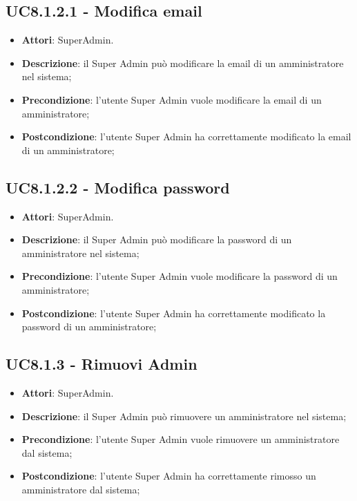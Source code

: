 \documentclass[../AnalisiDeiRequisiti.tex]{subfiles}
\begin{document}
\subsection{UC8.1.2.1 - Modifica email} 
\label{sssec:UC8.1.2.1} 
\begin{itemize} 
\item \textbf{Attori}: SuperAdmin.
\item \textbf{Descrizione}: il Super Admin può modificare la email di un amministratore nel sistema;
\item \textbf{Precondizione}: l'utente Super Admin vuole modificare la email di un amministratore;
\item \textbf{Postcondizione}: l'utente Super Admin ha correttamente  modificato la email di un amministratore;
\end{itemize} 
\subsection{UC8.1.2.2 - Modifica password} 
\label{sssec:UC8.1.2.2} 
\begin{itemize} 
\item \textbf{Attori}: SuperAdmin.
\item \textbf{Descrizione}: il Super Admin può modificare la password di un amministratore nel sistema;
\item \textbf{Precondizione}: l'utente Super Admin vuole modificare la password di un amministratore;
\item \textbf{Postcondizione}: l'utente Super Admin ha correttamente  modificato la password di un amministratore;
\end{itemize} 
\subsection{UC8.1.3 - Rimuovi Admin} 
\label{sssec:UC8.1.3} 
\begin{itemize} 
\item \textbf{Attori}: SuperAdmin.
\item \textbf{Descrizione}: il Super Admin può rimuovere un amministratore nel sistema;
\item \textbf{Precondizione}: l'utente Super Admin vuole rimuovere un amministratore dal sistema;
\item \textbf{Postcondizione}: l'utente Super Admin ha correttamente  rimosso un amministratore dal sistema;
\end{itemize} 
\end{document}
